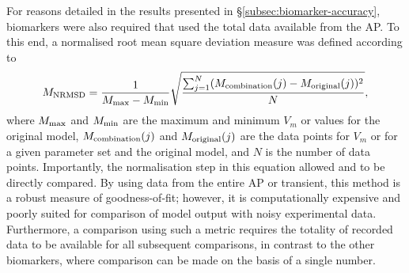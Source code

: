 \documentclass[../thesis-main.tex]{subfiles}
\begin{document}
For reasons detailed in the results presented in \S\ref{subsec:biomarker-accuracy}, biomarkers were also required that used the total data available from the AP. To this end, a normalised root mean square deviation measure was defined according to
\begin{equation}
 M_\textnormal{NRMSD} = \frac{1}{M_\textnormal{max}-M_\textnormal{min}}\sqrt{\frac{\sum_{j=1}^N (M_\textnormal{combination}(j)-M_\textnormal{original}(j))^2}{N}}, \label{eq:nrmsd}
\end{equation}
where $M_\textnormal{max}$ and $M_\textnormal{min}$ are the maximum and minimum $V_m$ or \cai{} values for the original model, $M_\textnormal{combination}(j)$ and $M_\textnormal{original}(j)$ are the data points for $V_m$ or \cai{} for a given parameter set and the original model, and $N$ is the number of data points. Importantly, the normalisation step in this equation allowed \aprms{} and \carms{} to be directly compared. By using data from the entire AP or \ca{} transient, this method is a robust measure of goodness-of-fit; however, it is computationally expensive and poorly suited for comparison of model output with noisy experimental data. Furthermore, a comparison using such a metric requires the totality of recorded data to be available for all subsequent comparisons, in contrast to the other biomarkers, where comparison can be made on the basis of a single number.

\biblio
\end{document}
